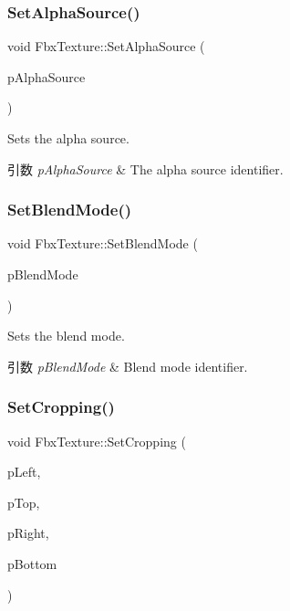 \subsubsection{\texorpdfstring{Set\+Alpha\+Source()}{SetAlphaSource()}}
{\footnotesize\ttfamily void Fbx\+Texture\+::\+Set\+Alpha\+Source (\begin{DoxyParamCaption}\item[{\hyperlink{class_fbx_texture_a12777ea406718d186e21b9656716171d}{E\+Alpha\+Source}}]{p\+Alpha\+Source }\end{DoxyParamCaption})}

Sets the alpha source. 
\begin{DoxyParams}{引数}
{\em p\+Alpha\+Source} & The alpha source identifier. \\
\hline
\end{DoxyParams}
\mbox{\label{class_fbx_texture_a8809f20ef579aea161142784dc671ec9}} 
\subsubsection{\texorpdfstring{Set\+Blend\+Mode()}{SetBlendMode()}}
{\footnotesize\ttfamily void Fbx\+Texture\+::\+Set\+Blend\+Mode (\begin{DoxyParamCaption}\item[{\hyperlink{class_fbx_texture_af1e8597086589ba6b8ba0066d47b6b63}{E\+Blend\+Mode}}]{p\+Blend\+Mode }\end{DoxyParamCaption})}

Sets the blend mode. 
\begin{DoxyParams}{引数}
{\em p\+Blend\+Mode} & Blend mode identifier. \\
\hline
\end{DoxyParams}
\mbox{\label{class_fbx_texture_a8466d23b8049dca1175c24ca4e209f47}} 
\subsubsection{\texorpdfstring{Set\+Cropping()}{SetCropping()}}
{\footnotesize\ttfamily void Fbx\+Texture\+::\+Set\+Cropping (\begin{DoxyParamCaption}\item[{int}]{p\+Left,  }\item[{int}]{p\+Top,  }\item[{int}]{p\+Right,  }\item[{int}]{p\+Bottom }\end{DoxyParamCaption})}

